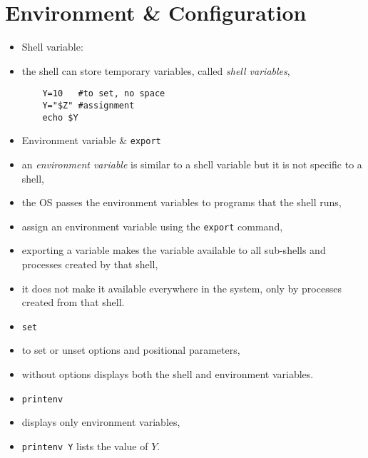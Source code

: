 \documentclass[twocolumn]{IEEEtran} %
\begin{document}
\section{Environment \& Configuration}
\begin{itemize}
    \item Shell variable:
    \bi
        \item the shell can store temporary variables, called \emph{shell variables},
    \ei
    \begin{verbatim}
    Y=10   #to set, no space
    Y="$Z" #assignment
    echo $Y
    \end{verbatim}
    \item Environment variable \& \verb|export|
    \bi
        \item an \emph{environment variable} is similar to a shell variable but it is not specific to a shell,
        \item the OS passes the environment variables to programs that the shell runs,
        \item assign an environment variable using the \verb|export| command,
        \item exporting a variable makes the variable available to all sub-shells and processes created by that shell,
        \item it does not make it available everywhere in the system, only by processes created from that shell.
    \ei
    \item \verb|set|
    \bi
        \item to set or unset options and positional parameters,
        \item without options displays both the shell and environment variables.
    \ei
    \item \verb|printenv|
    \bi
        \item displays only environment variables,
        \item \verb|printenv Y| lists the value of $Y$.
    \ei
\end{itemize}
\end{document}
